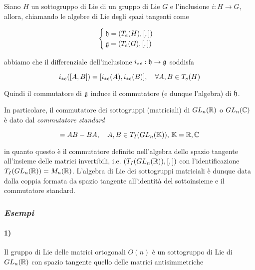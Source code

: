 \begin{corollary}\label{cor:incl-alg-lie-subg}
	Siano $ H $ un sottogruppo di Lie di un gruppo di Lie $ G $ e l'inclusione $ i : H \to G $, allora, chiamando le algebre di Lie degli spazi tangenti come
	
	\begin{equation}
		\begin{cases}
			\mathfrak{h} = (T_{e}(H),[,])\\
			\mathfrak{g} = (T_{e}(G),[,])
		\end{cases}
	\end{equation}
	
	abbiamo che il differenziale dell'inclusione $ i_{*e} : \mathfrak{h} \to \mathfrak{g} $ soddisfa
	
	\begin{equation}
		i_{*e} (\comm{A}{B}) = \comm{i_{*e} (A)}{i_{*e} (B)} \qcomma \forall A,B \in T_{e}(H)
	\end{equation}

	Quindi il commutatore di $ \mathfrak{g} $ induce il commutatore (e dunque l'algebra) di $ \mathfrak{h} $.
\end{corollary}

In particolare, il commutatore dei sottogruppi (matriciali) di $ GL_{n}(\mathbb{R}) $ o $ GL_{n}(\mathbb{C}) $ è dato dal \textit{commutatore standard}

\begin{equation}
	[A,B] = A B - B A \qcomma A,B \in T_{I}(GL_{n}(\K)), \, \K = \R, \C
\end{equation}

in quanto questo è il commutatore definito nell'algebra dello spazio tangente all'insieme delle matrici invertibili, i.e. $ (T_{I}(GL_{n}(\mathbb{R})),[,]) $ con l'identificazione $ T_{I}(GL_{n}(\mathbb{R})) = M_{n}(\mathbb{R}) $. L'algebra di Lie dei sottogruppi matriciali è dunque data dalla coppia formata da spazio tangente all'identità del sottoinsieme e il commutatore standard.

\subsubsection{\textit{Esempi}}

\paragraph{1)}

Il gruppo di Lie delle matrici ortogonali $ O(n) $ è un sottogruppo di Lie di $ GL_{n}(\mathbb{R}) $ con spazio tangente quello delle matrici antisimmetriche

